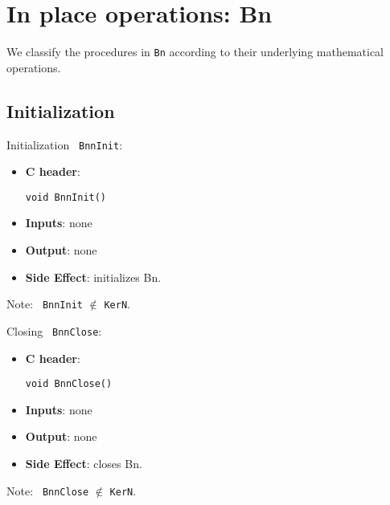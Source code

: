 \clearpage
\section{In place operations: Bn}
We classify the procedures in \verb+Bn+ according to their
underlying mathematical operations.

\subsection{Initialization}
\begin{func} Initialization \verb+ BnnInit+:
\begin{itemize}
 \item {\bf C header}: 
\begin{verbatim}
void BnnInit()
\end{verbatim}
 \item {\bf Inputs}: none 
 \item {\bf Output}: none
 \item {\bf Side Effect}: initializes Bn.
\end{itemize}
\end{func}
Note: \verb+ BnnInit+ $\notin$ \verb+KerN+.

\begin{func} Closing \verb+ BnnClose+:
\begin{itemize}
 \item {\bf C header}: 
\begin{verbatim}
void BnnClose()
\end{verbatim}
 \item {\bf Inputs}: none 
 \item {\bf Output}: none
 \item {\bf Side Effect}: closes Bn.
\end{itemize}
\end{func}
Note: \verb+ BnnClose+ $\notin$ \verb+KerN+.

